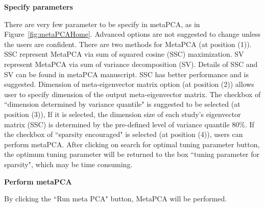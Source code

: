 \begin{steps}

\item \textbf{Specify parameters} 

There are very few parameter to be specify in metaPCA, as in Figure~\ref{fig:metaPCAHome}.
Advanced options are not suggested to change unless the users are confident.
There are two methods for MetaPCA (at position {\color{red} (1)}). 
SSC represent MetaPCA via sum of squared cosine (SSC) maximization.
SV represent MetaPCA via sum of variance decomposition (SV).
Details of SSC and SV can be found in metaPCA manuscript.
SSC has better performance and is suggested.
Dimension of meta-eigenvector matrix option (at position {\color{red} (2)}) allows user to specify dimension of the output meta-eigenvector matrix.
The checkbox of ``dimension determined by variance quantile" is suggested to be selected (at position {\color{red} (3)}),
If it is selected, the dimension size of each study's eigenvector matrix (SSC) is determined  by the pre-defined level of variance quantile 80\%.
If the checkbox of ``sparsity encouraged" is selected (at position {\color{red} (4)}), users can perform metaPCA.
After clicking on search for optimal tuning parameter button, the optimum tuning parameter will be returned to the box ``tuning parameter for sparsity", 
which may be time consuming.

\item \textbf{Perform metaPCA} 

By clicking the ``Run meta PCA" button, MetaPCA will be performed.


\end{steps}

